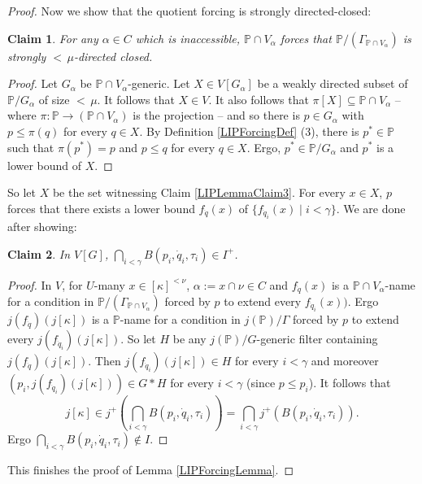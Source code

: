\documentclass[a4paper]{amsart}
\theoremstyle{definition}
\theoremstyle{remark}
\theoremstyle{plain}
\newtheorem{myclaim}{Claim}
\numberwithin{mydef}{section}
\newcommand{\dP}{\mathbb{P}}
\begin{document}
\begin{proof}
		Now we show that the quotient forcing is strongly directed-closed:
		
		\begin{myclaim}
			For any $\alpha\in C$ which is inaccessible, $\dP\cap V_{\alpha}$ forces that $\dP/(\Gamma_{\dP\cap V_{\alpha}})$ is strongly ${<}\,\mu$-directed closed.
		\end{myclaim}
		
		\begin{proof}
			Let $G_{\alpha}$ be $\dP\cap V_{\alpha}$-generic. Let $X\in V[G_{\alpha}]$ be a weakly directed subset of $\dP/G_{\alpha}$ of size ${<}\,\mu$. It follows that $X\in V$. It also follows that $\pi[X]\subseteq\dP\cap V_{\alpha}$ -- where $\pi\colon\dP\to(\dP\cap V_{\alpha})$ is the projection -- and so there is $p\in G_{\alpha}$ with $p\leq\pi(q)$ for every $q\in X$. By Definition \ref{LIPForcingDef} (3), there is $p^*\in\dP$ such that $\pi(p^*)=p$ and $p\leq q$ for every $q\in X$. Ergo, $p^*\in\dP/G_{\alpha}$ and $p^*$ is a lower bound of $X$.
		\end{proof}
		
		So let $X$ be the set witnessing Claim \ref{LIPLemmaClaim3}. For every $x\in X$, $p$ forces that there exists a lower bound $f_{\dot{q}}(x)$ of $\{f_{\dot{q}_i}(x)\;|\;i<\gamma\}$. We are done after showing:
		
		\begin{myclaim}
			In $V[G]$, $\bigcap_{i<\gamma}B(p_i,\dot{q}_i,\tau_i)\in I^+$.
		\end{myclaim}
		
		\begin{proof}
			In $V$, for $U$-many $x\in[\kappa]^{<\nu}$, $\alpha:=x\cap\nu\in C$ and $f_{\dot{q}}(x)$ is a $\dP\cap V_{\alpha}$-name for a condition in $\dP/(\Gamma_{\dP\cap V_{\alpha}})$ forced by $p$ to extend every $f_{\dot{q}_i}(x))$. Ergo $j(f_{\dot{q}})(j[\kappa])$ is a $\dP$-name for a condition in $j(\dP)/\Gamma$ forced by $p$ to extend every $j(f_{\dot{q}_i})(j[\kappa])$. So let $H$ be any $j(\dP)/G$-generic filter containing $j(f_{\dot{q}})(j[\kappa])$. Then $j(f_{\dot{q}_i})(j[\kappa])\in H$ for every $i<\gamma$ and moreover $(p_i,j(f_{\dot{q}_i})(j[\kappa]))\in G*H$ for every $i<\gamma$ (since $p\leq p_i$). It follows that
			$$j[\kappa]\in j^+\left(\bigcap_{i<\gamma}B(p_i,\dot{q}_i,\tau_i)\right)=\bigcap_{i<\gamma}j^+(B(p_i,\dot{q}_i,\tau_i)).$$
			Ergo $\bigcap_{i<\gamma}B(p_i,\dot{q}_i,\tau_i)\notin I$.
		\end{proof}
		
		This finishes the proof of Lemma \ref{LIPForcingLemma}.
		
	\end{proof}
	
\end{document}
